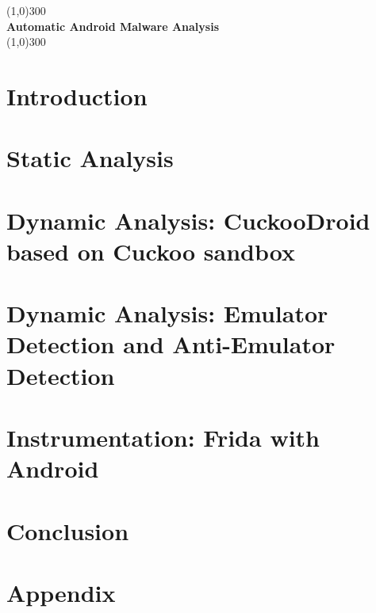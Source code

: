 \documentclass{report}
\begin{document}
	\begin{titlepage}
		\begin{center}
			\line(1,0){300}\\
			\huge{\bfseries Automatic Android Malware Analysis}\\
			\line(1,0){300}\\
		\end{center}
	\end{titlepage}
	
	\tableofcontents
	\cleardoublepage
	
	\chapter{Introduction}\label{sec:intro}
		
		\pagebreak
	\chapter{Static Analysis}\label{sec:static_analysis}
		
		\pagebreak
	\chapter{Dynamic Analysis: CuckooDroid based on Cuckoo sandbox}\label{sec:cuckoodroid}
		
		\pagebreak
	
	\chapter{Dynamic Analysis: Emulator Detection and Anti-Emulator Detection} \label{sec:Chp4}
		
		\pagebreak
	
	\chapter{Instrumentation: Frida with Android} \label{sec:Chp5}
		
		\pagebreak

	\chapter{Conclusion} \label{conclusion}
		
		\pagebreak

	\chapter{Appendix} \label{app:appendix}
		
		\pagebreak


	
	
\end{document}
